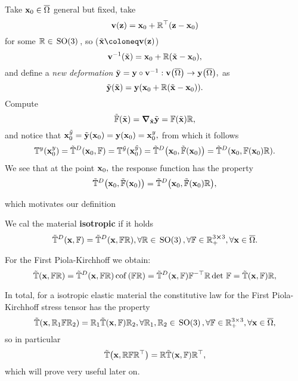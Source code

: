 \documentclass[11pt]{scrartcl} %
\begin{document}
Take $\vb{x}_0 \in \overline{\Omega}$ general but fixed, take
\[
	\vb{v}\qty(\vb{z})=\vb{x}_0 + \mathbb{R}^\top\qty(\vb{z}-\vb{x}_0)
\]
for some $\mathbb{R} \in \, \text{SO(3)} \,$, so ($\tilde{\vb{x}} \coloneq \vb{v}\qty(\vb{z})$)
\[
	\vb{v}^{-1}\qty(\tilde{\vb{x}}) = \vb{x}_0 + \mathbb{R}\qty(\tilde{\vb{x}} - \vb{x}_0),
\]
and define a \textit{new deformation} $\tilde{\vb{y}}=\vb{y}\circ \vb{v}^{-1}: \vb{v}\qty(\overline{\Omega}) \to \vb{y}\qty(\overline{\Omega}), $ as
\[
	\tilde{\vb{y}}\qty(\tilde{\vb{x}})=\vb{y}\qty(\vb{x}_0+\mathbb{R}\qty(\tilde{\vb{x}}-\vb{x}_0)).
\]
Compute
\[
	\tilde{\mathbb{F}}\qty(\tilde{\vb{x}}) = \grad_{\tilde{\vb{x}}} \tilde{\vb{y}} = \mathbb{F}\qty(\tilde{\vb{x}}) \mathbb{R},
\]
and notice that $\vb{x}_0^{\tilde{y}} = \tilde{\vb{y}}\qty(\vb{x}_0) = \vb{y}\qty(\vb{x}_0) = \vb{x}_0^{y},$ from which it follows
\[
	\mathbb{T}^y\qty(\vb{x}_0^{y})=\tilde{\mathbb{T}}^D\qty(\vb{x}_0, \mathbb{F})= \mathbb{T}^{\tilde{y}}(\vb{x}^{\tilde{y}}_0) = \tilde{\mathbb{T}}^D\qty(\vb{x}_0, \tilde{\mathbb{F}}\qty(\vb{x}_0)) = \tilde{\mathbb{T}}^D\qty(\vb{x}_0, \mathbb{F}\qty(\vb{x}_0) \mathbb{R}).
\]
We see that at the point $\vb{x}_0,$ the response function has the property
\[
	\tilde{\mathbb{T}}^D\qty(\vb{x}_0, \tilde{\mathbb{F}}\qty(\vb{x}_0)) = \tilde{\mathbb{T}}^D\qty(\vb{x}_0, \tilde{\mathbb{F}}\qty(\vb{x}_0)\mathbb{R}),
\]

which motivates our definition

\begin{definition}
	We cal the material \textbf{isotropic} if it holds
	\[
		\tilde{\mathbb{T}}^D\qty(\vb{x},\mathbb{F}) = \tilde{\mathbb{T}}^D\qty(\vb{x},\mathbb{F} \mathbb{R}), \forall \mathbb{R} \in \, \text{SO(3)} \,, \forall \mathbb{F} \in {\mathbb R}^{3 \cross 3}_+, \forall \vb{x} \in \overline{\Omega}.
	\]
\end{definition}
\begin{remark}
	For the First Piola-Kirchhoff we obtain:
	\[
		\tilde{\mathbb{T}}\qty(\vb{x}, \mathbb{F} \mathbb{R}) = \tilde{\mathbb{T}}^D\qty(\vb{x}, \mathbb{F} \mathbb{R})\operatorname{cof}\qty(\mathbb{F} \mathbb{R}) = \tilde{\mathbb{T}}^D\qty(\vb{x}, \mathbb{F}) \mathbb{F}^{-\top} \mathbb{R} \det\, \mathbb{F} = \tilde{\mathbb{T}}\qty(\vb{x}, \mathbb{F})\mathbb{R},
	\]
\end{remark}

In total, for a isotropic elastic material the constitutive law for the First Piola-Kirchhoff stress tensor has the property
\[
	\tilde{\mathbb{T}}\qty(\vb{x}, \mathbb{R}_1 \mathbb{F} \mathbb{R}_2) = \mathbb{R}_1 \tilde{\mathbb{T}}\qty(\vb{x}, \mathbb{F}) \mathbb{R}_2, \forall \mathbb{R}_1, \mathbb{R}_2 \in \, \text{SO(3)} \,, \forall \mathbb{F} \in {\mathbb R}^{3 \times 3}_+, \forall \vb{x} \in \overline{\Omega},
\]
so in particular
\[
	\tilde{\mathbb{T}}\qty(\vb{x}, \mathbb{R} \mathbb{F} \mathbb{R}^\top) = \mathbb{R} \tilde{\mathbb{T}}\qty(\vb{x}, \mathbb{F}) \mathbb{R}^\top,
\]
which will prove very useful later on.
\end{document}
